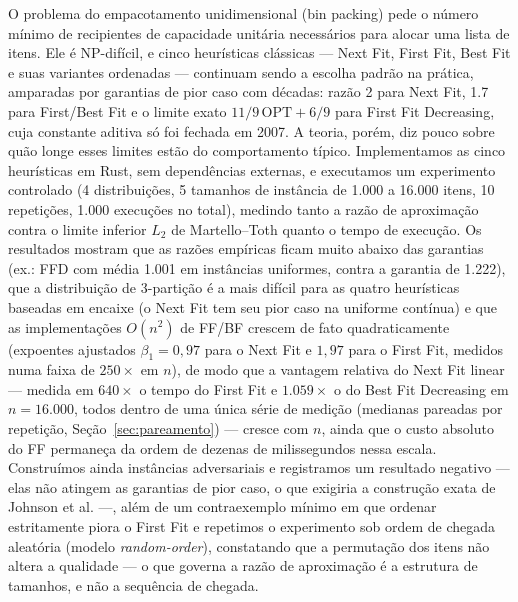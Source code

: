 \documentclass[12pt]{article}
\begin{document}
\begin{resumo}
\begin{sloppypar}
O problema do empacotamento unidimensional (bin packing) pede o número mínimo de recipientes de capacidade unitária necessários para alocar uma lista de itens. Ele é NP-difícil, e cinco heurísticas clássicas --- Next Fit, First Fit, Best Fit e suas variantes ordenadas --- continuam sendo a escolha padrão na prática, amparadas por garantias de pior caso com décadas: razão 2 para Next Fit, 1.7 para First/Best Fit e o limite exato $11/9\,\mathrm{OPT}+6/9$ para First Fit Decreasing, cuja constante aditiva só foi fechada em 2007. A teoria, porém, diz pouco sobre quão longe esses limites estão do comportamento típico. Implementamos as cinco heurísticas em Rust, sem dependências externas, e executamos um experimento controlado (4 distribuições, 5 tamanhos de instância de 1.000 a 16.000 itens, 10 repetições, 1.000 execuções no total), medindo tanto a razão de aproximação contra o limite inferior $L_2$ de Martello--Toth quanto o tempo de execução. Os resultados mostram que as razões empíricas ficam muito abaixo das garantias (ex.: FFD com média 1.001 em instâncias uniformes, contra a garantia de 1.222), que a distribuição de 3-partição é a mais difícil para as quatro heurísticas baseadas em encaixe (o Next Fit tem seu pior caso na uniforme contínua) e que as implementações $O(n^2)$ de FF/BF crescem de fato quadraticamente (expoentes ajustados $\beta_1 = 0{,}97$ para o Next Fit e $1{,}97$ para o First Fit, medidos numa faixa de $250\times$ em $n$), de modo que a vantagem relativa do Next Fit linear --- medida em $640\times$ o tempo do First Fit e $1.059\times$ o do Best Fit Decreasing em $n = 16.000$, todos dentro de uma única série de medição (medianas pareadas por repetição, Seção~\ref{sec:pareamento}) --- cresce com $n$, ainda que o custo absoluto do FF permaneça da ordem de dezenas de milissegundos nessa escala. Construímos ainda instâncias adversariais e registramos um resultado negativo --- elas não atingem as garantias de pior caso, o que exigiria a construção exata de Johnson et al. ---, além de um contraexemplo mínimo em que ordenar estritamente piora o First Fit e repetimos o experimento sob ordem de chegada aleatória (modelo \textit{random-order}), constatando que a permutação dos itens não altera a qualidade --- o que governa a razão de aproximação é a estrutura de tamanhos, e não a sequência de chegada.
\end{sloppypar}
\end{resumo}
\end{document}

